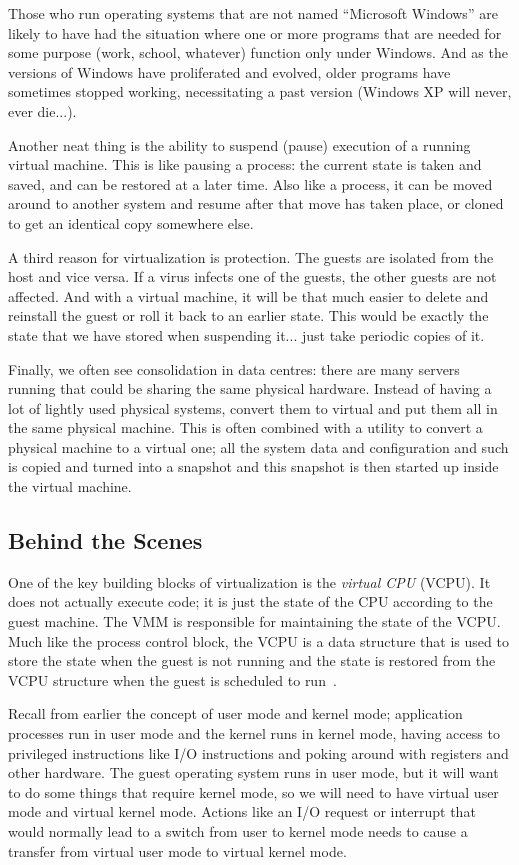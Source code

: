 Those who run operating systems that are not named ``Microsoft Windows'' are likely to have had the situation where one or more programs that are needed for some purpose (work, school, whatever) function only under Windows. And as the versions of Windows have proliferated and evolved, older programs have sometimes stopped working, necessitating a past version (Windows XP will never, ever die...).

Another neat thing is the ability to suspend (pause) execution of a running virtual machine. This is like pausing a process: the current state is taken and saved, and can be restored at a later time. Also like a process, it can be moved around to another system and resume after that move has taken place, or cloned to get an identical copy somewhere else.

A third reason for virtualization is protection. The guests are isolated from the host and vice versa. If a virus infects one of the guests, the other guests are not affected. And with a virtual machine, it will be that much easier to delete and reinstall the guest or roll it back to an earlier state. This would be exactly the state that we have stored when suspending it... just take periodic copies of it.

Finally, we often see consolidation in data centres: there are many servers running that could be sharing the same physical hardware. Instead of having a lot of lightly used physical systems, convert them to virtual and put them all in the same physical machine. This is often combined with a utility to convert a physical machine to a virtual one; all the system data and configuration and such is copied and turned into a snapshot and this snapshot is then started up inside the virtual machine.

\subsection*{Behind the Scenes}

One of the key building blocks of virtualization is the \textit{virtual CPU} (VCPU). It does not actually execute code; it is just the state of the CPU according to the guest machine. The VMM is responsible for maintaining the state of the VCPU. Much like the process control block, the VCPU is a data structure that is used to store the state when the guest is not running and the state is restored from the VCPU structure when the guest is scheduled to run~\cite{osc}.

Recall from earlier the concept of user mode and kernel mode; application processes run in user mode and the kernel runs in kernel mode, having access to privileged instructions like I/O instructions and poking around with registers and other hardware. The guest operating system runs in user mode, but it will want to do some things that require kernel mode, so we will need to have virtual user mode and virtual kernel mode. Actions like an I/O request or interrupt that would normally lead to a switch from user to kernel mode needs to cause a transfer from virtual user mode to virtual kernel mode.


